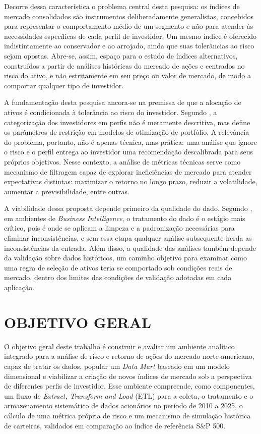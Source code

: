 Decorre dessa característica o problema central desta pesquisa: os índices de mercado consolidados são instrumentos deliberadamente generalistas, concebidos para representar o comportamento médio de um segmento e não para atender às necessidades específicas de cada perfil de investidor. Um mesmo índice é oferecido indistintamente ao conservador e ao arrojado, ainda que suas tolerâncias ao risco sejam opostas. Abre-se, assim, espaço para o estudo de índices alternativos, construídos a partir de análises históricas do mercado de ações e centrados no risco do ativo, e não estritamente em seu preço ou valor de mercado, de modo a comportar qualquer tipo de investidor.

A fundamentação desta pesquisa ancora-se na premissa de que a alocação de ativos é condicionada à tolerância ao risco do investidor. Segundo , a categorização dos investidores em perfis não é meramente descritiva, mas define os parâmetros de restrição em modelos de otimização de portfólio. A relevância do problema, portanto, não é apenas técnica, mas prática: uma análise que ignore o risco e o perfil entrega ao investidor uma recomendação descalibrada para seus próprios objetivos. Nesse contexto, a análise de métricas técnicas serve como mecanismo de filtragem capaz de explorar ineficiências de mercado para atender expectativas distintas: maximizar o retorno no longo prazo, reduzir a volatilidade, aumentar a previsibilidade, entre outras.

A viabilidade dessa proposta depende primeiro da qualidade do dado. Segundo , em ambientes de \textit{Business Intelligence}, o tratamento do dado é o estágio mais crítico, pois é onde se aplicam a limpeza e a padronização necessárias para eliminar inconsistências, e sem essa etapa qualquer análise subsequente herda as inconsistências da entrada. Além disso, a qualidade das análises também depende da validação sobre dados históricos, um caminho objetivo para examinar como uma regra de seleção de ativos teria se comportado sob condições reais de mercado, dentro dos limites das condições de validação adotadas em cada aplicação.

\section{OBJETIVO GERAL}
\label{sec:objetivo-geral}

O objetivo geral deste trabalho é construir e avaliar um ambiente analítico integrado para a análise de risco e retorno de ações do mercado norte-americano, capaz de tratar os dados, popular um \textit{Data Mart} baseado em um modelo dimensional e viabilizar a criação de novos índices de mercado sob a perspectiva de diferentes perfis de investidor. Esse ambiente compreende, como componentes, um fluxo de \textit{Extract, Transform and Load} (ETL) para a coleta, o tratamento e o armazenamento sistemático de dados acionários no período de 2010 a 2025, o cálculo de uma métrica própria de risco e um mecanismo de simulação histórica de carteiras, validados em comparação ao índice de referência S\&P 500.


